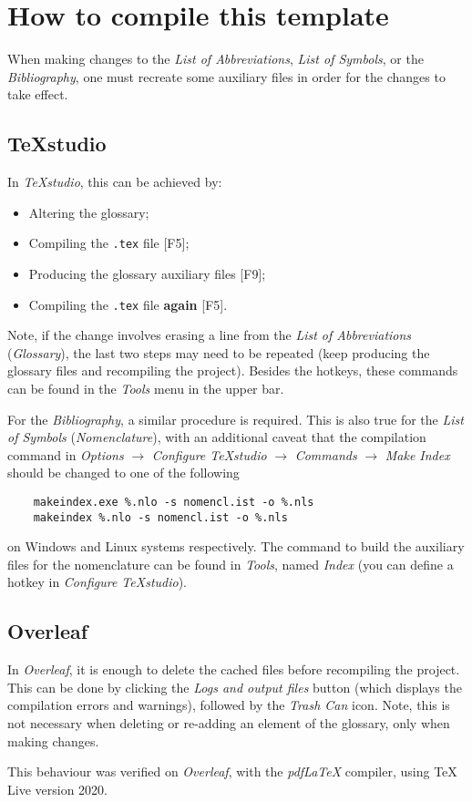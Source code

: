 \section{How to compile this template}

When making changes to the \textit{List of Abbreviations}, \textit{List of Symbols}, or the \textit{Bibliography}, one must recreate some auxiliary files in order for the changes to take effect.

\subsection{TeXstudio}

\noindent In \textit{TeXstudio}, this can be achieved by:
\begin{itemize}
	\item Altering the glossary;
	\item Compiling the \texttt{.tex} file [F5];
	\item Producing the glossary auxiliary files [F9];
	\item Compiling the \texttt{.tex} file \textbf{again} [F5].
\end{itemize}

\noindent Note, if the change involves erasing a line from the \textit{List of Abbreviations} (\textit{Glossary}), the last two steps may need to be repeated (keep producing the glossary files and recompiling the project). Besides the hotkeys, these commands can be found in the \textit{Tools} menu in the upper bar.

For the \textit{Bibliography}, a similar procedure is required. This is also true for the \textit{List of Symbols} (\textit{Nomenclature}), with an additional caveat that the compilation command in \textit{Options} $\rightarrow$ \textit{Configure TeXstudio} $\rightarrow$ \textit{Commands} $\rightarrow$ \textit{Make Index} should be changed to one of the following
\begin{verbatim}
	makeindex.exe %.nlo -s nomencl.ist -o %.nls
	makeindex %.nlo -s nomencl.ist -o %.nls
\end{verbatim}

\noindent on Windows and Linux systems respectively. The command to build the auxiliary files for the nomenclature can be found in \textit{Tools}, named \textit{Index} (you can define a hotkey in \textit{Configure TeXstudio}).

\subsection{Overleaf}

\noindent In \textit{Overleaf}, it is enough to delete the cached files before recompiling the project. This can be done by clicking the \textit{Logs and output files} button (which displays the compilation errors and warnings), followed by the \textit{Trash Can} icon. Note, this is not necessary when deleting or re-adding an element of the glossary, only when making changes.

This behaviour was verified on \textit{Overleaf}, with the \textit{pdfLaTeX} compiler, using TeX Live version 2020.


